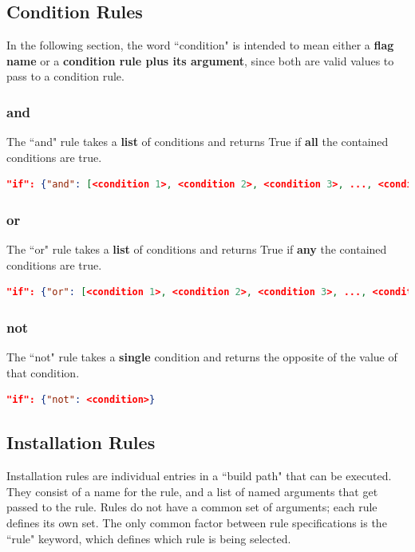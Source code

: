 \documentclass{article}
\begin{document}
\subsection{Condition Rules}\label{section:conditionrules}
In the following section, the word ``condition" is intended to mean either a \textbf{flag name} or a \textbf{condition rule plus its argument}, since both are valid values to pass to a condition rule.
\subsubsection{and}
The ``and" rule takes a \textbf{list} of conditions and returns True if \textbf{all} the contained conditions are true.
\begin{lstlisting}[language=json,firstnumber=1]
"if": {"and": [<condition 1>, <condition 2>, <condition 3>, ..., <condition N>]}
\end{lstlisting}
\subsubsection{or}
The ``or" rule takes a \textbf{list} of conditions and returns True if \textbf{any} the contained conditions are true.
\begin{lstlisting}[language=json,firstnumber=1]
"if": {"or": [<condition 1>, <condition 2>, <condition 3>, ..., <condition N>]}
\end{lstlisting}
\subsubsection{not}
The ``not" rule takes a \textbf{single} condition and returns the opposite of the value of that condition.
\begin{lstlisting}[language=json,firstnumber=1]
"if": {"not": <condition>}
\end{lstlisting}

\subsection{Installation Rules}\label{section:installationrules}
Installation rules are individual entries in a ``build path" that can be executed. They consist of a name for the rule, and a list of named arguments that get passed to the rule. Rules do not have a common set of arguments; each rule defines its own set. The only common factor between rule specifications is the ``rule" keyword, which defines which rule is being selected.
\end{document}
